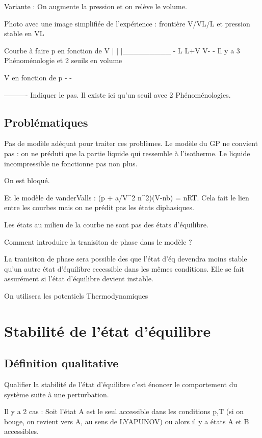 \documentclass[french]{yLectureNote}
\begin{document}
Variante : On augmente la pression et on relève le volume.

Photo avec une image simplifiée de l'expérience : frontière V/VL/L et pression stable en VL

Courbe à faire p en fonction de V 
|
|
|_________ 
            -
L     L+V   V-
              -
              Il y a 3 Phénoménologie et 2 seuils en volume

              V en fonction de p 
-
  -


    ----------
Indiquer le pas.
Il existe ici qu'un seuil avec  2 Phénoménologies.


\subsection{Problématiques}
Pas de modèle adéquat pour traiter ces problèmes. Le modèle du GP ne convient pas : on ne préduti que la partie liquide qui ressemble à l'isotherme. Le liquide incompressible ne fonctionne pas non plus.

On est bloqué.

Et le modèle de vanderValls : (p + a/V^2 n^2)(V-nb) = nRT. Cela fait le lien entre les courbes mais on ne prédit pas les états diphasiques.

Les états au milieu de la courbe ne sont pas des états d'équilibre.

Comment introduire la tranisiton de phase dans le modèle ?

\begin{proposition}
    La tranisiton de phase sera possible des que l'état d'éq devendra moins stable qu'un autre état d'équilibre eccessible dans les mêmes conditions. Elle se fait assurément si l'état d'équilibre devient instable.
\end{proposition}
On utilisera les potentiels Thermodynamiques
\section{Stabilité de l'état d'équilibre}
\subsection{Définition qualitative}
Qualifier la stabilité de l'état d'équilibre c'est énoncer le comportement du système suite à une perturbation.

Il y a 2 cas : Soit l'état A est le seul accessible dans les conditions p,T (si on bouge, on revient vers A, au sens de LYAPUNOV) ou alors il y a  états A et B accessibles.
\end{document}
